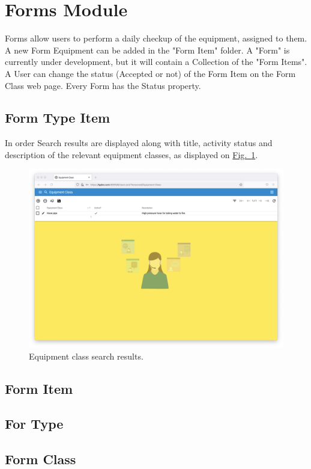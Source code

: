 \section{Forms Module}\label{sec:01}

Forms allow users to perform a daily checkup of the equipment, assigned to them. A new Form Equipment can be added in the "Form Item" folder. A "Form" is currently under development, but it will contain a Collection of the "Form Items". A User can change the status (Accepted or not) of the Form Item on the Form Class web page. Every Form has the Status property. 

\subsection{Form Type Item}
In order 
Search results are displayed along with title, activity status and description of the relevant equipment classes, as displayed on \hyperref[sections/equipment/images/Fig.3]{Fig.~\ref*{sections/equipment/images/Fig.3}}.

    \begin{figure}[!htbp]
	\centering
	\includegraphics[width=0.95\linewidth]{sections/equipment/images/Fig.3.png}
	\caption{Equipment class search results.}\label{sections/equipment/images/Fig.3}
	\end{figure}
	
\newpage

\subsection{Form Item}
\subsection{For Type}
\subsection{Form Class}

